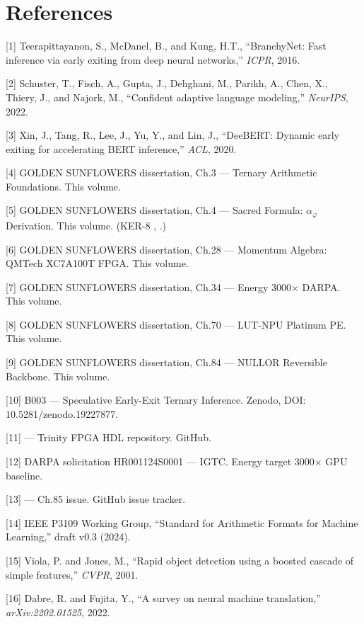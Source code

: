 \section{References}\label{fa_85:references}

[1] Teerapittayanon, S., McDanel, B., and Kung, H.T.,
``BranchyNet: Fast inference via early exiting from
deep neural networks,'' \textit{ICPR}, 2016.

[2] Schuster, T., Fisch, A., Gupta, J., Dehghani, M.,
Parikh, A., Chen, X., Thiery, J., and Najork, M.,
``Confident adaptive language modeling,''
\textit{NeurIPS}, 2022.

[3] Xin, J., Tang, R., Lee, J., Yu, Y., and Lin, J.,
``DeeBERT: Dynamic early exiting for accelerating
BERT inference,'' \textit{ACL}, 2020.

[4] GOLDEN SUNFLOWERS dissertation, Ch.3 ---
Ternary Arithmetic Foundations. This volume.

[5] GOLDEN SUNFLOWERS dissertation, Ch.4 ---
Sacred Formula: \(\alpha_\varphi\) Derivation.
This volume. (KER-8 ,
.)

[6] GOLDEN SUNFLOWERS dissertation, Ch.28 ---
Momentum Algebra: QMTech XC7A100T FPGA. This volume.

[7] GOLDEN SUNFLOWERS dissertation, Ch.34 ---
Energy 3000\(\times\) DARPA. This volume.

[8] GOLDEN SUNFLOWERS dissertation, Ch.70 ---
LUT-NPU Platinum PE. This volume.

[9] GOLDEN SUNFLOWERS dissertation, Ch.84 ---
NULLOR Reversible Backbone. This volume.

[10] B003 --- Speculative Early-Exit Ternary
Inference. Zenodo, DOI: 10.5281/zenodo.19227877.

[11]  --- Trinity
FPGA HDL repository. GitHub.

[12] DARPA solicitation HR001124S0001 --- IGTC.
Energy target 3000\(\times\) GPU baseline.

[13]  --- Ch.85
issue. GitHub issue tracker.

[14] IEEE P3109 Working Group, ``Standard for
Arithmetic Formats for Machine Learning,'' draft
v0.3 (2024).

[15] Viola, P. and Jones, M., ``Rapid object
detection using a boosted cascade of simple
features,'' \textit{CVPR}, 2001.

[16] Dabre, R. and Fujita, Y., ``A survey on neural
machine translation,'' \textit{arXiv:2202.01525},
2022.

